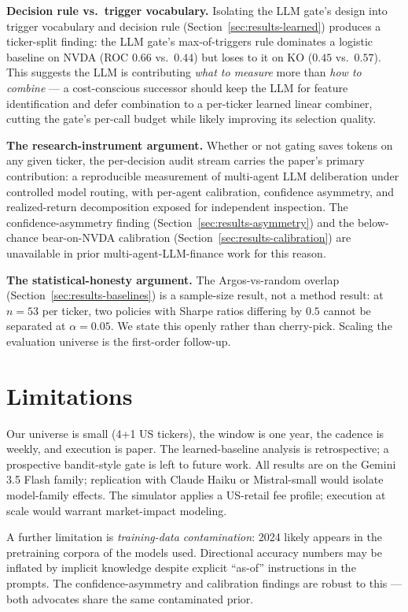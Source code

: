 \documentclass[conference]{IEEEtran}
\begin{document}
\textbf{Decision rule vs.\ trigger vocabulary.}
Isolating the LLM gate's design into trigger vocabulary and decision
rule (Section~\ref{sec:results-learned}) produces a ticker-split
finding: the LLM gate's max-of-triggers rule dominates a logistic
baseline on NVDA (ROC $0.66$ vs.\ $0.44$) but loses to it on KO
($0.45$ vs.\ $0.57$). This suggests the LLM is contributing
\emph{what to measure} more than \emph{how to combine} --- a
cost-conscious successor should keep the LLM for feature
identification and defer combination to a per-ticker learned linear
combiner, cutting the gate's per-call budget while likely improving
its selection quality.

\textbf{The research-instrument argument.}
Whether or not gating saves tokens on any given ticker, the
per-decision audit stream carries the paper's primary contribution:
a reproducible measurement of multi-agent LLM deliberation under
controlled model routing, with per-agent calibration, confidence
asymmetry, and realized-return decomposition exposed for independent
inspection. The confidence-asymmetry finding
(Section~\ref{sec:results-asymmetry}) and the below-chance
bear-on-NVDA calibration (Section~\ref{sec:results-calibration}) are
unavailable in prior multi-agent-LLM-finance work for this reason.

\textbf{The statistical-honesty argument.}
The Argos-vs-random overlap (Section~\ref{sec:results-baselines}) is
a sample-size result, not a method result: at $n{=}53$ per ticker,
two policies with Sharpe ratios differing by $0.5$ cannot be
separated at $\alpha{=}0.05$. We state this openly rather than
cherry-pick. Scaling the evaluation universe is the first-order
follow-up.

\section{Limitations}

Our universe is small (4+1 US tickers), the window is one year, the
cadence is weekly, and execution is paper. The learned-baseline
analysis is retrospective; a prospective bandit-style gate is left
to future work. All results are on the Gemini 3.5 Flash family;
replication with Claude Haiku or Mistral-small would isolate
model-family effects. The simulator applies a US-retail fee profile;
execution at scale would warrant market-impact modeling.

A further limitation is \emph{training-data contamination}: 2024
likely appears in the pretraining corpora of the models used.
Directional accuracy numbers may be inflated by implicit knowledge
despite explicit ``as-of'' instructions in the prompts. The
confidence-asymmetry and calibration findings are robust to this
--- both advocates share the same contaminated prior.
\end{document}
